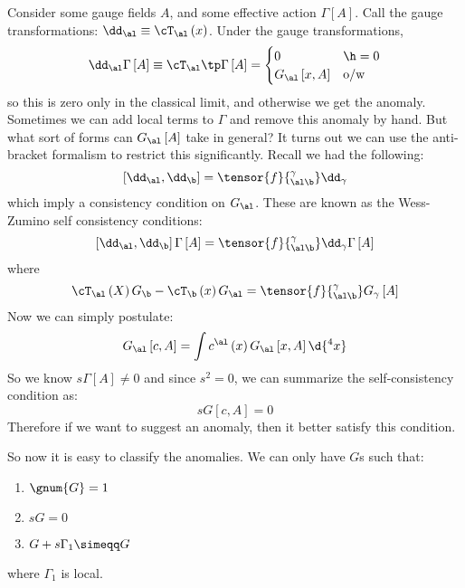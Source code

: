\documentclass{booc}
\begin{document}
Consider some gauge fields $A$, 
and some effective action $\Gamma\left[ A \right]$. 
Call the gauge transformations:
$\dd_\al \equiv \cT_\al\left( x \right)$.
Under the gauge transformations, 
\begin{equation}
\dd_\al \Gamma\left[ A \right] \equiv
\cT_\al \tp \Gamma\left[ A \right]
=
\begin{cases}
0 & \h = 0 \\
G_\al\left[ x , A \right]
& \text{o/w}
\end{cases}
\end{equation}
so this is zero only in the classical limit, and otherwise we get the anomaly. 
Sometimes we can add local terms to $\Gamma$ and remove this anomaly by hand. 
But what sort of forms can $G_\al\left[ A \right]$ take in general?
It turns out we can use the anti-bracket formalism to restrict this significantly.
Recall we had the following:
\begin{equation}
\left[ \dd_\al , \dd_\b \right] = \tensor{f}{_{\al\b}^\gamma}\dd_\gamma
\end{equation}
which imply a consistency condition on $G_\al$. 
These are known as the Wess-Zumino self consistency conditions:
\begin{equation}
\left[ \dd_\al , \dd_\b \right]\Gamma\left[ A \right] = 
\tensor{f}{_{\al \b}^\gamma} \dd_\gamma \Gamma\left[ A \right]
\end{equation}
where
\begin{equation}
\cT_\al\left( X \right)G_\b - \cT_\b\left( x \right) G_\al = 
\tensor{f}{_{\al\b}^\gamma} G_\gamma\left[ A \right]
\end{equation}
Now we can simply postulate:
\begin{equation}
G_\al\left[ c , A \right] = \int 
c^\al\left( x \right)G_\al\left[ x , A \right]\d{^4 x}
\end{equation}
So we know $s\Gamma\left[ A \right]\neq 0$ and 
since $s^2 = 0$, we can summarize the self-consistency condition as:
\begin{equation}
sG\left[ c , A \right] = 0
\end{equation}
Therefore if we want to suggest an anomaly, then it better satisfy this condition.

So now it is easy to classify the anomalies.
We can only have $G$s such that:
\begin{enumerate}
\item $\gnum{G} = 1$
\item $sG = 0$
\item $G + s\Gamma_1 \simeqq G$
\end{enumerate}
where $\Gamma_1$ is local.
\end{document}
